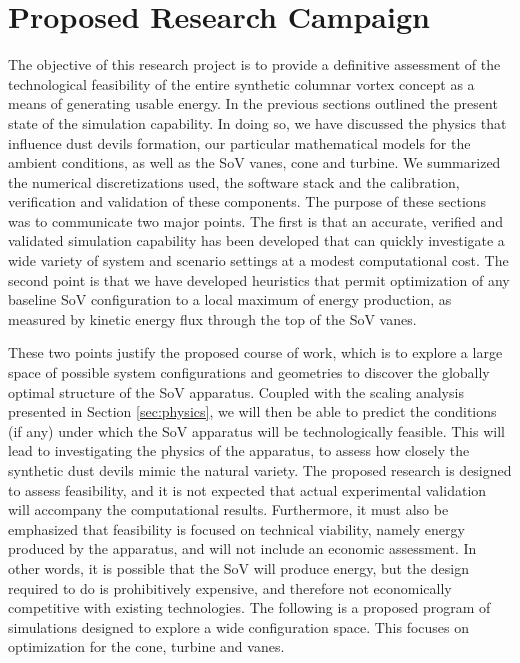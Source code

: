 \section{Proposed Research Campaign}
\label{sec:proposed_work}


The objective of this research project is to provide a definitive
assessment of the technological feasibility of the entire synthetic
columnar vortex concept as a means of generating usable energy. In the 
previous sections outlined the present state of the
simulation capability. In doing so, we have discussed the physics that
influence dust devils formation, our particular mathematical
models for the ambient conditions, as well as the SoV vanes, cone and
turbine. We summarized the numerical discretizations used, the software
stack and the calibration, verification and validation of these
components. The purpose of these sections was to communicate
two major points. The first is that an accurate, verified and
validated simulation capability has been developed that can quickly
investigate a wide variety of system and scenario settings at a modest
computational cost. The second point is that we have developed
heuristics that permit optimization of any baseline SoV configuration to
a local maximum of energy production, as measured by kinetic energy flux
through the top of the SoV vanes.  

These two points justify the proposed course of work, which is to
explore a large space of possible system configurations
and geometries to discover the globally optimal structure
of the SoV apparatus. Coupled with the scaling analysis presented in
Section \ref{sec:physics}, we will then be able to predict the
conditions (if any) under which the SoV apparatus will be
technologically feasible. This will lead to investigating the physics of the
apparatus, to assess how closely the synthetic dust devils mimic the
natural variety. The proposed research is designed to
assess feasibility, and it is not expected that actual experimental
validation will accompany the computational results. Furthermore, it
must also be emphasized that feasibility is focused on
technical viability, namely energy produced by the apparatus,
and will not include an economic assessment. In other words, it is
possible that the SoV will produce energy, but the design required to do
is prohibitively expensive, and therefore not economically competitive
with existing technologies. The following is a proposed program of simulations 
designed to explore a wide configuration space. This focuses on
optimization for the cone, turbine and vanes. 


